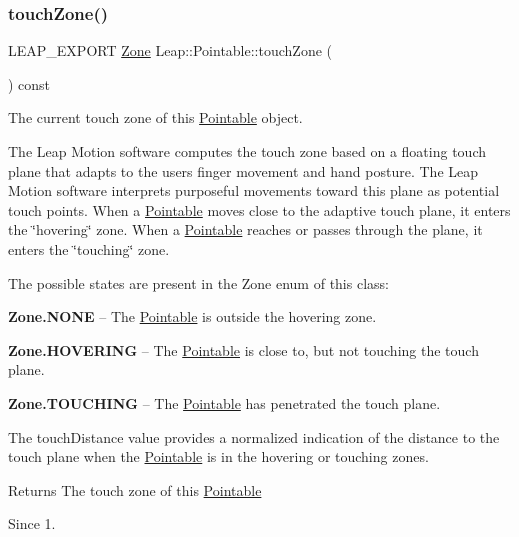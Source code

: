 \subsubsection{\texorpdfstring{touch\+Zone()}{touchZone()}}
{\footnotesize\ttfamily L\+E\+A\+P\+\_\+\+E\+X\+P\+O\+RT \hyperlink{class_leap_1_1_pointable_ad6e50b9878b8c1fdf899b5e09721deef}{Zone} Leap\+::\+Pointable\+::touch\+Zone (\begin{DoxyParamCaption}{ }\end{DoxyParamCaption}) const}

The current touch zone of this \hyperlink{class_leap_1_1_pointable}{Pointable} object.

The Leap Motion software computes the touch zone based on a floating touch plane that adapts to the user\textquotesingle{}s finger movement and hand posture. The Leap Motion software interprets purposeful movements toward this plane as potential touch points. When a \hyperlink{class_leap_1_1_pointable}{Pointable} moves close to the adaptive touch plane, it enters the \char`\"{}hovering\char`\"{} zone. When a \hyperlink{class_leap_1_1_pointable}{Pointable} reaches or passes through the plane, it enters the \char`\"{}touching\char`\"{} zone.

The possible states are present in the Zone enum of this class\+:

{\bfseries Zone.\+N\+O\+NE} -- The \hyperlink{class_leap_1_1_pointable}{Pointable} is outside the hovering zone.

{\bfseries Zone.\+H\+O\+V\+E\+R\+I\+NG} -- The \hyperlink{class_leap_1_1_pointable}{Pointable} is close to, but not touching the touch plane.

{\bfseries Zone.\+T\+O\+U\+C\+H\+I\+NG} -- The \hyperlink{class_leap_1_1_pointable}{Pointable} has penetrated the touch plane.

The touch\+Distance value provides a normalized indication of the distance to the touch plane when the \hyperlink{class_leap_1_1_pointable}{Pointable} is in the hovering or touching zones.


\begin{DoxyCodeInclude}
\end{DoxyCodeInclude}


\begin{DoxyReturn}{Returns}
The touch zone of this \hyperlink{class_leap_1_1_pointable}{Pointable} 
\end{DoxyReturn}
\begin{DoxySince}{Since}
1. 
\end{DoxySince}
\mbox{\label{class_leap_1_1_pointable_ae5c75d491542529cfb61a91fe3865522}} 
